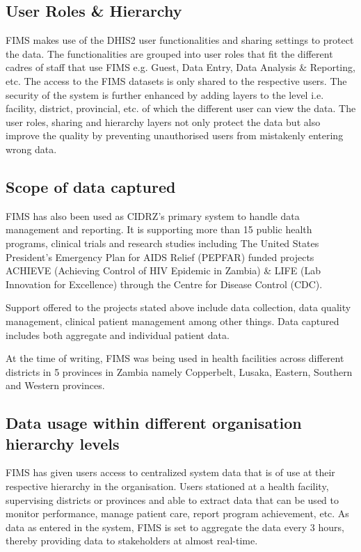\documentclass[conference]{IEEEtran}
\begin{document}
\subsection{User Roles \& Hierarchy}
FIMS makes use of the DHIS2 user functionalities and sharing settings to protect the data. The functionalities are grouped into user roles that fit the different cadres of staff that use FIMS e.g. Guest, Data Entry, Data Analysis \& Reporting, etc.
The access to the FIMS datasets is only shared to the respective users. The security of the system is further enhanced by adding layers to the  level i.e. facility, district, provincial, etc. of which the different user can view the data.
The user roles, sharing and hierarchy layers not only protect the data but also improve the quality by preventing unauthorised users from mistakenly entering wrong data.

\subsection{Scope of data captured}
FIMS has also been used as CIDRZ's primary system to handle data management and reporting. It is supporting more than 15 public health programs, clinical trials and research studies including The United States President's Emergency Plan for AIDS Relief (PEPFAR) funded
projects ACHIEVE (Achieving Control of HIV Epidemic in Zambia) \& LIFE (Lab Innovation for Excellence) through the Centre for Disease Control (CDC).

Support offered to the projects stated above include data collection, data quality management, clinical patient management among other things. Data captured includes both aggregate and individual patient data.

At the time of writing, FIMS was being used in health facilities across different districts in 5 provinces in Zambia namely Copperbelt, Lusaka, Eastern, Southern and Western provinces.

\subsection{Data usage within different organisation hierarchy levels}
FIMS has given users access to centralized system data that is of use at their respective hierarchy in the organisation. Users stationed at a health facility, supervising districts or provinces and able to extract data that can be used to monitor performance,
manage patient care, report program achievement, etc. As data as entered in the system, FIMS is set to aggregate the data every 3 hours, thereby providing data to stakeholders at almost real-time.
\end{document}
